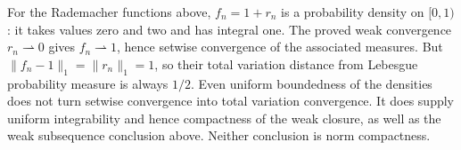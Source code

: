 \begin{example}
For the Rademacher functions above, $f_n=1+r_n$ is a probability density
on $[0,1)$: it takes values zero and two and has integral one.
The proved weak convergence $r_n\rightharpoonup0$ gives
$f_n\rightharpoonup1$, hence setwise convergence of the associated
measures. But $\|f_n-1\|_1=\|r_n\|_1=1$, so their total variation
distance from Lebesgue probability measure is always $1/2$.
Even uniform boundedness of the densities does not turn setwise
convergence into total variation convergence. It does supply uniform
integrability and hence compactness of the weak closure, as well as the
weak subsequence conclusion above. Neither conclusion is norm compactness.
\end{example}


